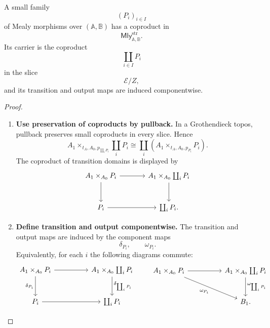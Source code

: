 \begin{proposition}
\label{prop:small-coproducts-mealy}
    A small family
    \[
        (P_i)_{i\in I}
    \]
    of Mealy morphisms over \((\mathbb A,\mathbb B)\) has a coproduct in
    \[
        \mathsf{Mly}^{\mathrm{str}}_{\mathbb A,\mathbb B}.
    \]
    Its carrier is the coproduct
    \[
        \coprod_{i\in I}P_i
    \]
    in the slice
    \[
        \mathcal E/Z,
    \]
    and its transition and output maps are induced componentwise.
\end{proposition}

\begin{proof}
    \leavevmode
    \begin{enumerate}
        \item \textbf{Use preservation of coproducts by pullback.}
        In a Grothendieck topos, pullback preserves small coproducts in every
        slice. Hence
        \[
            A_1\times_{t_A,A_0,p_{\coprod_iP_i}}
            \coprod_iP_i
            \cong
            \coprod_i
            \left(
                A_1\times_{t_A,A_0,p_{P_i}}P_i
            \right).
        \]
        The coproduct of transition domains is displayed by
        \[
        \begin{tikzcd}[column sep=large, row sep=large]
            A_1\times_{A_0}P_i
                \arrow[r]
                \arrow[d]
            &
            A_1\times_{A_0}\coprod_iP_i
                \arrow[d]
            \\
            P_i
                \arrow[r]
            &
            \coprod_iP_i .
        \end{tikzcd}
        \]

        \item \textbf{Define transition and output componentwise.}
        The transition and output maps are induced by the component maps
        \[
            \delta_{P_i},
            \qquad
            \omega_{P_i}.
        \]
        Equivalently, for each \(i\) the following diagrams commute:
        \[
        \begin{tikzcd}[column sep=huge, row sep=large]
            A_1\times_{A_0}P_i
                \arrow[r]
                \arrow[d, "\delta_{P_i}"']
            &
            A_1\times_{A_0}\coprod_iP_i
                \arrow[d, "\delta_{\coprod_iP_i}"]
            \\
            P_i
                \arrow[r]
            &
            \coprod_iP_i
        \end{tikzcd}
        \qquad
        \begin{tikzcd}[column sep=huge, row sep=large]
            A_1\times_{A_0}P_i
                \arrow[r]
                \arrow[dr, "\omega_{P_i}"']
            &
            A_1\times_{A_0}\coprod_iP_i
                \arrow[d, "\omega_{\coprod_iP_i}"]
            \\
            &
            B_1 .
        \end{tikzcd}
        \]


\end{enumerate}
\end{proof}
